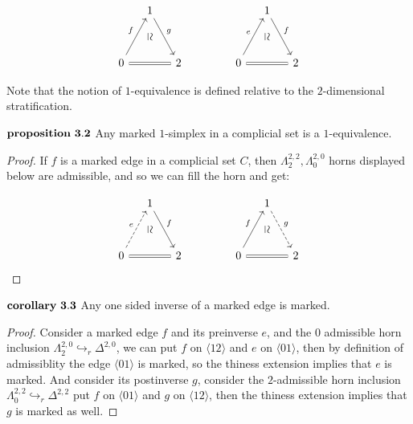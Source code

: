 \documentclass[11pt]{article}
\newcommand{\vsimeq}{\rotatebox[origin=c]{-90}{$\simeq$}}
\begin{document}
$$
\begin{tikzcd}[column sep=small, row sep=small]
& 1 \arrow{rdd}{g} \\
& \vsimeq \\
0 \arrow{uur}{f} \arrow[equal]{rr}{} &  & 2
\end{tikzcd}\hspace{40pt}
\begin{tikzcd}[column sep=small, row sep=small]
& 1 \arrow{rdd}{f} \\
& \vsimeq \\
0 \arrow{uur}{e} \arrow[equal]{rr}{} &  & 2
\end{tikzcd}
$$

Note that the notion of $1$-equivalence is defined relative to the $2$-dimensional stratification.

$\bf proposition \ 3.2$ Any marked $1$-simplex in a complicial set is a $1$-equivalence.

\begin{proof}
	If $f$ is a marked edge in a complicial set $C$, then $\Lambda^{2,2}_2,\Lambda^{2,0}_0$ horns displayed below are admissible, and so we can fill the horn and get:
	
$$
\begin{tikzcd}[column sep=small, row sep=small]
& 1 \arrow{rdd}{f} \\
& \vsimeq \\
0 \arrow[dashed]{uur}{e} \arrow[equal]{rr}{} &  & 2
\end{tikzcd}
\hspace{40pt}
\begin{tikzcd}[column sep=small, row sep=small]
& 1 \arrow[dashed]{rdd}{g} \\
& \vsimeq \\
0 \arrow{uur}{f} \arrow[equal]{rr}{} &  & 2
\end{tikzcd}
$$
	
	
\end{proof}

$\bf corollary \ 3.3 $ Any one sided inverse of a marked edge is marked.

\begin{proof}
   Consider a marked edge $f$ and its preinverse $e$, and the $0$ admissible horn inclusion $\Lambda^{2,0}_2\hookrightarrow_r \Delta^{2,0}$, we can put $f$ on $\langle 12\rangle$ and $e$ on $\langle 01\rangle$, then by definition of admissiblity the edge $\langle 01\rangle$ is marked, so the thiness extension implies that $e$ is marked.
   And consider its postinverse $g$, consider the $2$-admissible horn inclusion $\Lambda^{2,2}_0\hookrightarrow_r \Delta^{2,2}$ put $f$ on $\langle 01\rangle$ and $g$ on $\langle 12\rangle$, then the thiness extension implies that $g$ is marked as well.
\end{proof}
\end{document}

